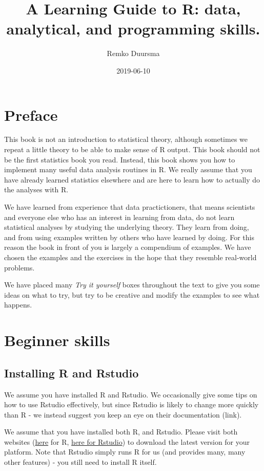 \documentclass[]{book}
\title{A Learning Guide to R: data, analytical, and programming skills.}
\author{Remko Duursma}
\date{2019-06-10}
\begin{document}
\maketitle

{
\setcounter{tocdepth}{1}
\tableofcontents
}
\hypertarget{preface}{%
\chapter{Preface}\label{preface}}

This book is not an introduction to statistical theory, although sometimes we repeat a little theory to be able to make sense of R output. This book should not be the first statistics book you read. Instead, this book shows you how to implement many useful data analysis routines in R. We really assume that you have already learned statistics elsewhere and are here to learn how to actually do the analyses with R.

We have learned from experience that data practictioners, that means scientists and everyone else who has an interest in learning from data, do not learn statistical analyses by studying the underlying theory. They learn from doing, and from using examples written by others who have learned by doing. For this reason the book in front of you is largely a compendium of examples. We have chosen the examples and the exercises in the hope that they resemble real-world problems.

We have placed many \emph{Try it yourself} boxes throughout the text to give you some ideas on what to try, but try to be creative and modify the examples to see what happens.

\hypertarget{intro}{%
\chapter{Beginner skills}\label{intro}}

\hypertarget{installingr}{%
\section{Installing R and Rstudio}\label{installingr}}

We assume you have installed R and Rstudio. We occasionally give some tips on how to use Rstudio effectively, but since Rstudio is likely to change more quickly than R - we instead suggest you keep an eye on their documentation (link).

We assume that you have installed both R, and Rstudio. Please visit both websites (\href{http://cran.r-project.org}{here} for R, \href{www.rstudio.org}{here for Rstudio}) to download the latest version for your platform. Note that Rstudio simply runs R for us (and provides many, many other features) - you still need to install R itself.
\end{document}
